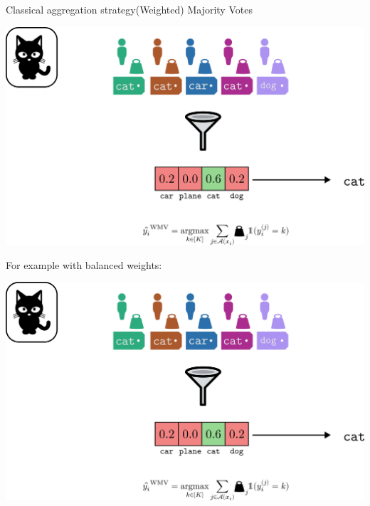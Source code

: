 \begin{frame}{Classical aggregation strategy}{(Weighted) Majority Votes}
    \begin{center}
        \includegraphics[width=.8\textwidth, clip, trim={50cm 0cm 30cm 80cm}]{./images/MV_label.pdf}
    \end{center}

        For example with balanced weights:

    \begin{center}
        \includegraphics[width=\textwidth, clip, trim={0cm 10cm 0cm 0cm}]{./images/MV_label.pdf}
    \end{center}

\end{frame}

